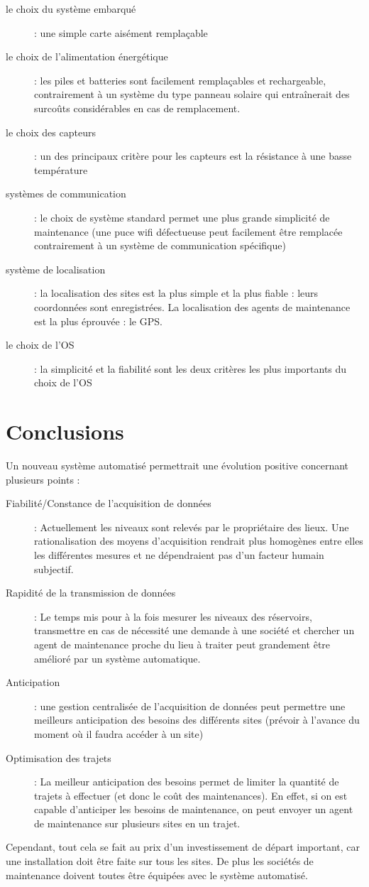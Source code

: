 \documentclass{article}
\begin{document}
\begin{description}
\item[le choix du système embarqué] : une simple carte aisément
remplaçable
\item[le choix de l’alimentation énergétique] : les piles et batteries
sont facilement remplaçables et rechargeable, contrairement à un
système du type panneau solaire qui entraînerait des surcoûts
considérables en cas de remplacement.
\item[le choix des capteurs] : un des principaux critère pour les
capteurs est la résistance à une basse température
\item[systèmes de communication] : le choix de système standard permet
une plus grande simplicité de maintenance (une puce wifi défectueuse
peut facilement être remplacée contrairement à un système de
communication spécifique)
\item[système de localisation] : la localisation des sites est la plus
simple et la plus fiable : leurs coordonnées sont enregistrées. La
localisation des agents de maintenance est la plus éprouvée : le GPS.
\item[le choix de l’OS] : la simplicité et la fiabilité sont les deux
critères les plus importants du choix de l’OS
\end{description}

\section{Conclusions}
Un nouveau système automatisé permettrait une évolution positive
concernant plusieurs points :

\begin{description}
\item[Fiabilité/Constance de l’acquisition de données] : Actuellement les
niveaux sont relevés par le propriétaire des lieux. Une rationalisation
des moyens d’acquisition rendrait plus homogènes entre elles les
différentes mesures et ne dépendraient pas d’un facteur humain
subjectif.
\item[Rapidité de la transmission de données] : Le temps mis pour à la
fois mesurer les niveaux des réservoirs, transmettre en cas de
nécessité une demande à une société et chercher un agent de maintenance
proche du lieu à traiter peut grandement être amélioré par un système
automatique.
\item[Anticipation] : une gestion centralisée de l’acquisition de données
peut permettre une meilleurs anticipation des besoins des différents
sites (prévoir à l’avance du moment où il faudra accéder à un site)
\item[Optimisation des trajets] : La meilleur anticipation des besoins
permet de limiter la quantité de trajets à effectuer (et donc le coût
des maintenances). En effet, si on est capable d’anticiper les besoins
de maintenance, on peut envoyer un agent de maintenance sur plusieurs
sites en un trajet.
\end{description}
Cependant, tout cela se fait au prix d’un investissement de départ
important, car une installation doit être faite sur tous les sites. De
plus les sociétés de maintenance doivent toutes être équipées avec le
système automatisé.
\end{document}
